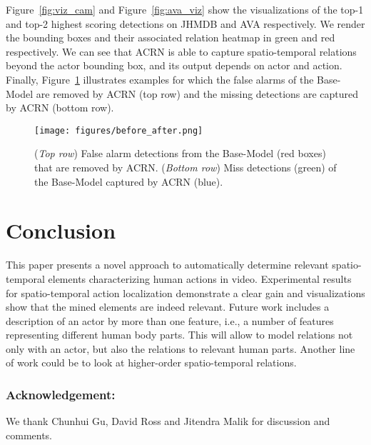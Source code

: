 \documentclass[runningheads]{llncs}
\begin{document}
Figure~\ref{fig:viz_cam} and Figure~\ref{fig:ava_viz} show the visualizations of the top-1 and top-2 highest scoring detections on JHMDB and AVA respectively. We render the bounding boxes and their associated relation heatmap in green and red respectively. We can see that ACRN is able to capture spatio-temporal relations beyond the actor bounding box, and its output depends on actor and action. Finally, Figure~\ref{fig:before_after} illustrates examples for which the false alarms of the Base-Model are removed by ACRN (top row) and the missing detections are captured by ACRN (bottom row).

\begin{figure}[t]
\centering
\texttt{[image: figures/before\_after.png]}
\caption{(\textit{Top row}) False alarm detections from the Base-Model (red boxes) that are removed by ACRN. (\textit{Bottom row}) Miss detections (green) of the Base-Model captured by ACRN (blue).}
\label{fig:before_after}
\end{figure}
 

\section{Conclusion}
This paper presents a novel approach to automatically determine relevant spatio-temporal elements characterizing human actions in video. Experimental results for spatio-temporal action localization demonstrate a clear gain and visualizations show that the mined elements are indeed relevant. Future work includes a description of an actor by more than one feature, i.e., a number of features representing different human body parts. This will allow to model relations not only with an actor, but also the relations to relevant human parts. Another line of work could be to look at higher-order spatio-temporal relations. 



\subsubsection{Acknowledgement:} We thank Chunhui Gu, David Ross and Jitendra Malik for discussion and comments.



\end{document}
